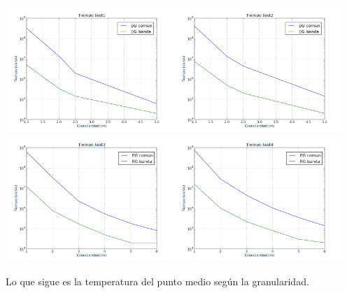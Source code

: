\documentclass[a4paper]{article}
\begin{document}
\begin{center}
 \includegraphics[width=180pt]{img/tiempo1.png}\includegraphics[width=180pt]{img/tiempo2.png}
\includegraphics[width=180pt]{img/tiempo3.png}\includegraphics[width=180pt]{img/tiempo4.png} 

Lo que sigue es la temperatura del punto medio según la granularidad. 


\end{center}
\end{document}
